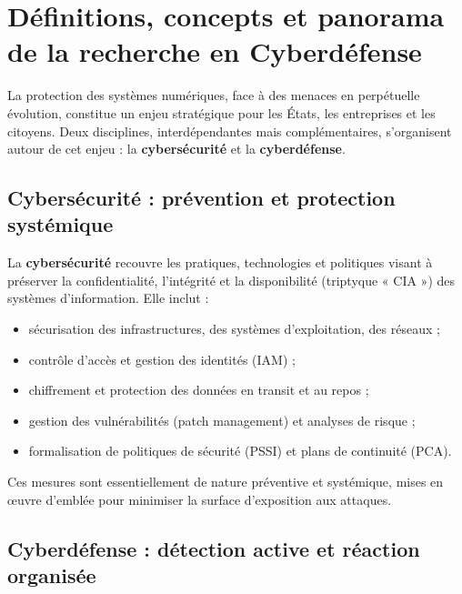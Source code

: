 \documentclass[ twoside,openright,titlepage,numbers=noenddot,headinclude,%
                footinclude=true,cleardoublepage=empty,abstractoff, %
                BCOR=5mm,paper=a4,fontsize=11pt,%
                french,american,%
                ]{scrreprt}
\begin{document}
\section{Définitions, concepts et panorama de la recherche en Cyberdéfense}\label{sec:cyberdef-panorama}


La protection des systèmes numériques, face à des menaces en perpétuelle évolution, constitue un enjeu stratégique pour les États, les entreprises et les citoyens. Deux disciplines, interdépendantes mais complémentaires, s’organisent autour de cet enjeu : la \textbf{cybersécurité} et la \textbf{cyberdéfense}.

\subsection*{Cybersécurité : prévention et protection systémique}

La \textbf{cybersécurité} recouvre les pratiques, technologies et politiques visant à préserver la confidentialité, l’intégrité et la disponibilité (triptyque « CIA ») des systèmes d’information. Elle inclut :
\begin{itemize}
  \item sécurisation des infrastructures, des systèmes d’exploitation, des réseaux ;
  \item contrôle d’accès et gestion des identités (IAM) ;
  \item chiffrement et protection des données en transit et au repos ;
  \item gestion des vulnérabilités (patch management) et analyses de risque ;
  \item formalisation de politiques de sécurité (PSSI) et plans de continuité (PCA).
\end{itemize}
Ces mesures sont essentiellement de nature préventive et systémique, mises en œuvre d’emblée pour minimiser la surface d’exposition aux attaques.

\subsection*{Cyberdéfense : détection active et réaction organisée}
\end{document}
